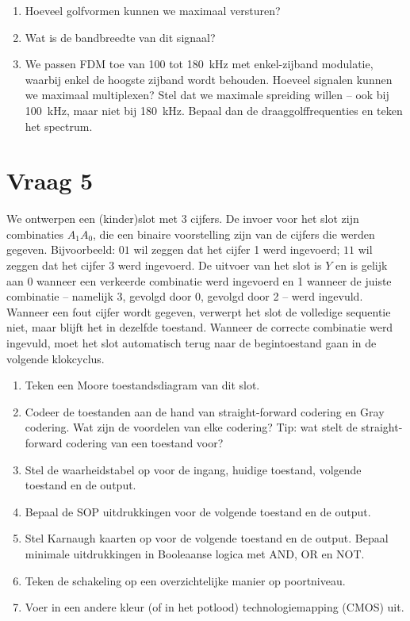 \documentclass[kulak]{kulakarticle}
\begin{document}
	\begin{enumerate}
		\item Hoeveel golfvormen kunnen we maximaal versturen?
		\item Wat is de bandbreedte van dit signaal?
		\item We passen FDM toe van 100 tot \SI{180}{\kilo\hertz} met enkel-zijband modulatie, waarbij enkel de hoogste zijband wordt behouden. Hoeveel signalen kunnen we maximaal multiplexen? Stel dat we maximale spreiding willen -- ook bij \SI{100}{\kilo\hertz}, maar niet bij \SI{180}{\kilo\hertz}. Bepaal dan de draaggolffrequenties en teken het spectrum.
	\end{enumerate}

	\section*{Vraag 5}

	We ontwerpen een (kinder)slot met 3 cijfers. De invoer voor het slot zijn combinaties \(A_1 A_0\), die een binaire voorstelling zijn van de cijfers die werden gegeven. Bijvoorbeeld: \(01\) wil zeggen dat het cijfer 1 werd ingevoerd; \(11\) wil zeggen dat het cijfer 3 werd ingevoerd. De uitvoer van het slot is \(Y\) en is gelijk aan 0 wanneer een verkeerde combinatie werd ingevoerd en 1 wanneer de juiste combinatie -- namelijk 3, gevolgd door 0, gevolgd door 2 -- werd ingevuld. Wanneer een fout cijfer wordt gegeven, verwerpt het slot de volledige sequentie niet, maar blijft het in dezelfde toestand. Wanneer de correcte combinatie werd ingevuld, moet het slot automatisch terug naar de begintoestand gaan in de volgende klokcyclus.

	\begin{enumerate}
		\item Teken een Moore toestandsdiagram van dit slot.
		\item Codeer de toestanden aan de hand van straight-forward codering en Gray codering. Wat zijn de voordelen van elke codering? Tip: wat stelt de straight-forward codering van een toestand voor?
		\item Stel de waarheidstabel op voor de ingang, huidige toestand, volgende toestand en de output.
		\item Bepaal de SOP uitdrukkingen voor de volgende toestand en de output.
		\item Stel Karnaugh kaarten op voor de volgende toestand en de output. Bepaal minimale uitdrukkingen in Booleaanse logica met AND, OR en NOT.
		\item Teken de schakeling op een overzichtelijke manier op poortniveau.
		\item Voer in een andere kleur (of in het potlood) technologiemapping (CMOS) uit.
	\end{enumerate}
\end{document}
